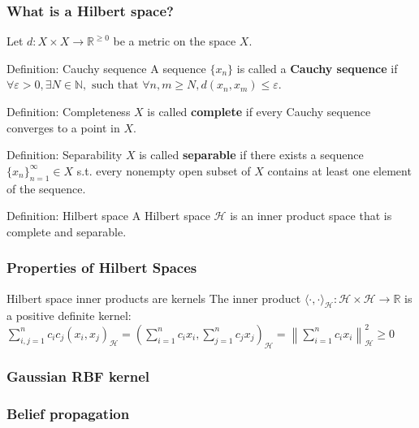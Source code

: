 \documentclass{beamer}
\begin{document}
    \begin{frame}
        \frametitle{What is a Hilbert space?}
            Let $d: X\times X \rightarrow \mathbb R^{\geq 0}$ be a metric on the space $X$. \\
        \begin{block}{Definition: Cauchy sequence}
            A sequence $\{x_n\}$ is called a \textbf{Cauchy sequence} if $\forall \varepsilon > 0, \exists N \in \mathbb{N}, \text{ such that } \forall n,m \geq N, d(x_n,x_m)\leq \varepsilon$. \\
        \end{block}
        \begin{block}{Definition: Completeness}
            $X$ is called \textbf{complete} if every Cauchy sequence converges to a point in $X$.
        \end{block}
        \begin{block}{Definition: Separability}
            $X$ is called \textbf{separable} if there exists a sequence $\{x_n\}_{n = 1}^\infty \in X$ s.t. every nonempty open subset of $X$ contains at least one element of the sequence.
        \end{block}
        \begin{block}{Definition: Hilbert space}
            A Hilbert space $\mathcal H$ is an inner product space that is complete and separable.
        \end{block}
    \end{frame}

    \begin{frame}
        \frametitle{Properties of Hilbert Spaces}
        \begin{block}{Hilbert space inner products are kernels}
            The inner product $\langle\cdot ,\cdot \rangle_{\mathcal H}:\mathcal H\times \mathcal H\to \mathbb {R}$  is a positive definite kernel:
            $\sum _{i,j=1}^{n}c_{i}c_{j}(x_{i},x_{j})_{\mathcal H}=\left(\sum _{i=1}^{n}c_{i}x_{i},\sum _{j=1}^{n}c_{j}x_{j}\right)_{\mathcal H}=\left\|\sum _{i=1}^{n}c_{i}x_{i}\right\|_{\mathcal H}^{2}\geq 0$
        \end{block}

    \end{frame}

    \begin{frame}
        \frametitle{Gaussian RBF kernel}
    \end{frame}

    \begin{frame}
        \frametitle{Belief propagation}
    \end{frame}
\end{document}
